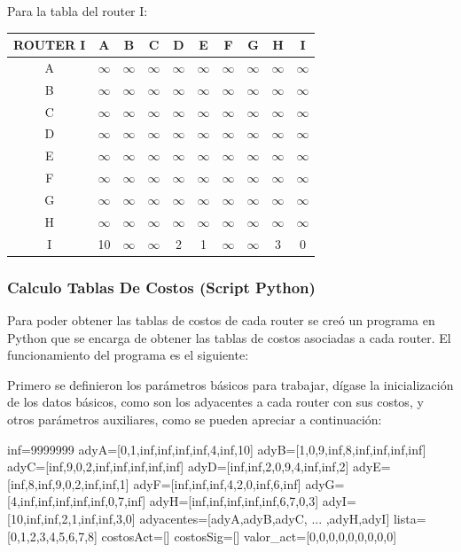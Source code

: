 \documentclass{article}
\begin{document}
Para la tabla del router I:\\
\begin{tabular}{ | c | c | c | c | c | c | c | c | c | c |}
\hline                 
ROUTER I    & A      & B      & C      & D      & E      & F      & G      & H      & I      \\
\hline
        A   &$\infty$&$\infty$&$\infty$&$\infty$&$\infty$&$\infty$&$\infty$&$\infty$&$\infty$\\
\hline
        B   &$\infty$&$\infty$&$\infty$&$\infty$&$\infty$&$\infty$&$\infty$&$\infty$&$\infty$\\
\hline
        C   &$\infty$&$\infty$&$\infty$&$\infty$&$\infty$&$\infty$&$\infty$&$\infty$&$\infty$\\
\hline
        D   &$\infty$&$\infty$&$\infty$&$\infty$&$\infty$&$\infty$&$\infty$&$\infty$&$\infty$\\
\hline
        E   &$\infty$&$\infty$&$\infty$&$\infty$&$\infty$&$\infty$&$\infty$&$\infty$&$\infty$\\
\hline
        F   &$\infty$&$\infty$&$\infty$&$\infty$&$\infty$&$\infty$&$\infty$&$\infty$&$\infty$\\
\hline
        G   &$\infty$&$\infty$&$\infty$&$\infty$&$\infty$&$\infty$&$\infty$&$\infty$&$\infty$\\
\hline
        H   &$\infty$&$\infty$&$\infty$&$\infty$&$\infty$&$\infty$&$\infty$&$\infty$&$\infty$\\
\hline 
        I   & 10     &$\infty$&$\infty$& 2      & 1      &$\infty$&$\infty$& 3      & 0      \\
\hline
\end{tabular}
\subsubsection*{Calculo Tablas De Costos (Script Python)}
Para poder obtener las tablas de costos de cada router se creó un programa en Python que se encarga de obtener las tablas de costos asociadas a cada router. El funcionamiento del programa es el siguiente:

Primero se definieron los parámetros básicos para trabajar, dígase la inicialización de los datos básicos, como son los adyacentes a cada router con sus costos, y otros parámetros auxiliares, como se pueden apreciar a continuación:

\begin{python}
inf=9999999
adyA=[0,1,inf,inf,inf,inf,4,inf,10]
adyB=[1,0,9,inf,8,inf,inf,inf,inf]
adyC=[inf,9,0,2,inf,inf,inf,inf,inf]
adyD=[inf,inf,2,0,9,4,inf,inf,2]
adyE=[inf,8,inf,9,0,2,inf,inf,1]
adyF=[inf,inf,inf,4,2,0,inf,6,inf]
adyG=[4,inf,inf,inf,inf,inf,0,7,inf]
adyH=[inf,inf,inf,inf,inf,6,7,0,3]
adyI=[10,inf,inf,2,1,inf,inf,3,0]	
adyacentes=[adyA,adyB,adyC, ... ,adyH,adyI]
lista=[0,1,2,3,4,5,6,7,8]
costosAct=[]
costosSig=[]
valor_act=[0,0,0,0,0,0,0,0,0]
\end{python}
\end{document}
